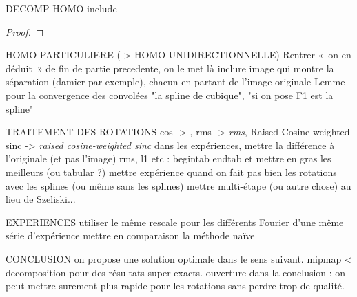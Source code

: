 DECOMP HOMO
	include \begin{proof} \end{proof}

HOMO PARTICULIERE (-> HOMO UNIDIRECTIONNELLE)
	Rentrer « on en déduit » de fin de partie precedente, on le met là
	inclure image qui montre la séparation (damier par exemple), chacun en partant de l'image originale
	Lemme pour la convergence des convolées
	"la spline de cubique", "si on pose F1 est la spline"

TRAITEMENT DES ROTATIONS
	cos -> \cos, rms -> \emph{rms}, Raised-Cosine-weighted sinc -> \emph{raised cosine-weighted sinc}
	dans les expériences, mettre la différence à l'originale (et pas l'image)
	rms, l1 etc : begin{tab} end{tab} et mettre en gras les meilleurs (ou tabular ?)
	mettre expérience quand on fait pas bien les rotations avec les splines (ou même sans les splines)
	mettre multi-étape (ou autre chose) au lieu de Szeliski...

EXPERIENCES
	utiliser le même rescale pour les différents Fourier d'une même série d'expérience
	mettre en comparaison la méthode naïve

CONCLUSION
	on propose une solution optimale dans le sens suivant. mipmap < decomposition pour des résultats super exacts.
	ouverture dans la conclusion : on peut mettre surement plus rapide pour les rotations sans perdre trop de qualité.
